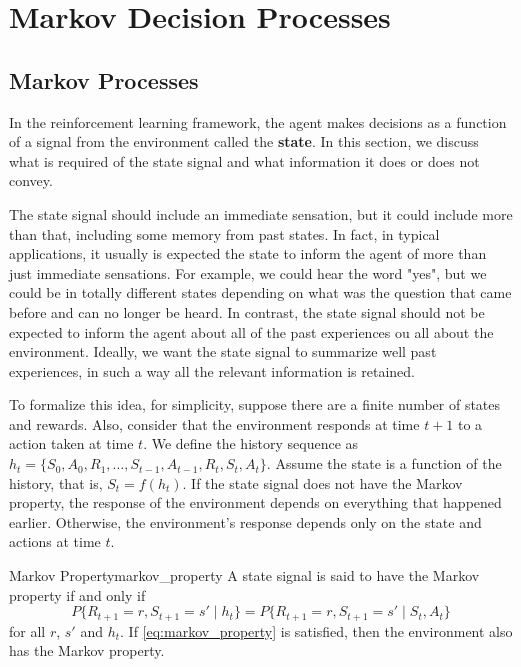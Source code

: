 
\chapter{Markov Decision Processes}

\section{Markov Processes}

In the reinforcement learning framework, the agent makes decisions as a function of a signal from the environment called the \textbf{state}. In this section, we discuss what is required of the state signal and what information it does or does not convey.

The state signal should include an immediate sensation, but it could include more than that, including some memory from past states. In fact, in typical applications, it usually is expected the state to inform the agent of more than just immediate sensations. For example, we could hear the word "yes", but we could be in totally different states depending on what was the question that came before and can no longer be heard. In contrast, the state signal should not be expected to inform the agent about all of the past experiences ou all about the environment. Ideally, we want the state signal to summarize well past experiences, in such a way all the relevant information is retained. 

To formalize this idea, for simplicity, suppose there are a finite number of states and rewards. Also, consider that the environment responds at time $t+1$ to a action taken at time $t$. We define the history sequence as $h_t = \{S_0, A_0, R_1, \dots, S_{t-1}, A_{t-1}, R_t, S_t, A_t\}$. Assume the state is a function of the history, that is, $S_t = f(h_t)$. If the state signal does not have the Markov property, the response of the environment depends on everything that happened earlier. Otherwise, the environment's response depends only on the state and actions at time $t$.
\begin{definition}{Markov Property}{markov_property}
      A state signal is said to have the Markov property if and only if
      \begin{equation}\label{eq:markov_property}
            P\{R_{t+1} = r, S_{t+1} = s' \mid h_t\} = P\{R_{t+1} = r, S_{t+1} = s' \mid S_t, A_t\}
      \end{equation}
      for all $r$, $s'$ and $h_t$. If \ref{eq:markov_property} is satisfied, then the environment also has the Markov property.   
\end{definition}
